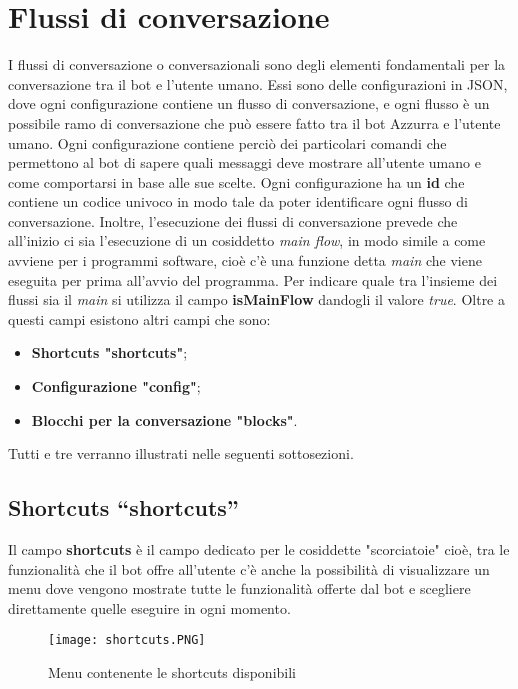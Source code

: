 \section{Flussi di conversazione}
I flussi di conversazione o conversazionali sono degli elementi fondamentali per la conversazione tra il bot e l'utente umano. Essi sono delle configurazioni in JSON, dove ogni configurazione contiene un flusso di conversazione, e ogni flusso è un possibile ramo di conversazione che può essere fatto tra il bot Azzurra e l'utente umano. Ogni configurazione contiene perciò dei particolari comandi che permettono al bot di sapere quali messaggi deve mostrare all'utente umano e come comportarsi in base alle sue scelte. Ogni configurazione ha un \textbf{id} che contiene un codice univoco in modo tale da poter identificare ogni flusso di conversazione. Inoltre, l'esecuzione dei flussi di conversazione prevede che all'inizio ci sia l'esecuzione di un cosiddetto \emph{main flow}, in modo simile a come avviene per i programmi software, cioè c'è una funzione detta \emph{main} che viene eseguita per prima all'avvio del programma. Per indicare quale tra l'insieme dei flussi sia il \emph{main} si utilizza il campo \textbf{isMainFlow} dandogli il valore \emph{true}.
Oltre a questi campi esistono altri campi che sono:\\
\begin{itemize}
	\item \textbf{Shortcuts "shortcuts"};
	\item \textbf{Configurazione "config"};
	\item \textbf{Blocchi per la conversazione "blocks"}.
\end{itemize}
Tutti e tre verranno illustrati nelle seguenti sottosezioni.
\subsection{Shortcuts “shortcuts”}
Il campo \textbf{shortcuts} è il campo dedicato per le cosiddette "scorciatoie" cioè, tra le funzionalità che il bot offre all'utente c'è anche la possibilità di visualizzare un menu dove vengono mostrate tutte le funzionalità offerte dal bot e scegliere direttamente quelle eseguire in ogni momento.

\begin{figure}[htbp]
	\centering
	\texttt{[image: shortcuts.PNG]}
	\caption{Menu contenente le shortcuts disponibili}
\end{figure}

